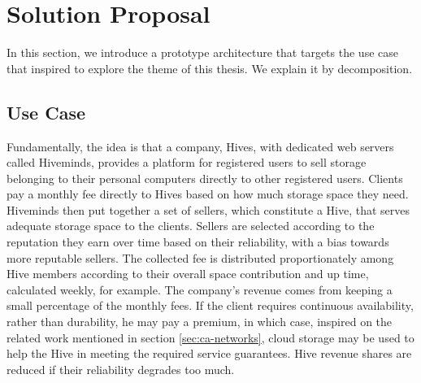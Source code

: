 \documentclass[runningheads]{llncs}
\begin{document}

\newpage\section{Solution Proposal}\label{sec:proposal}
In this section, we introduce a prototype architecture that targets the use case that inspired to explore the theme of this thesis. We explain it by decomposition.

\subsection{Use Case}
Fundamentally, the idea is that a company, Hives, with dedicated web servers called Hiveminds, provides a platform for registered users to sell storage belonging to their personal computers directly to other registered users. Clients pay a monthly fee directly to Hives based on how much storage space they need. Hiveminds then put together a set of sellers, which constitute a Hive, that serves adequate storage space to the clients. Sellers are selected according to the reputation they earn over time based on their reliability, with a bias towards more reputable sellers. The collected fee is distributed proportionately among Hive members according to their overall space contribution and up time, calculated weekly, for example. The company's revenue comes from keeping a small percentage of the monthly fees. If the client requires continuous availability, rather than durability, he may pay a premium, in which case, inspired on the related work mentioned in section \ref{sec:ca-networks}, cloud storage may be used to help the Hive in meeting the required service guarantees. Hive revenue shares are reduced if their reliability degrades too much.
\end{document}
